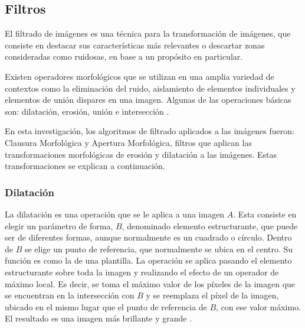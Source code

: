 \subsection{Filtros}\label{sec:filtros}
El filtrado de imágenes es una técnica para la transformación de imágenes, que consiste en destacar  sus características más relevantes o descartar zonas consideradas como ruidosas, en base a un propósito en particular. 

Existen operadores morfológicos que se utilizan en una amplia variedad de contextos como la eliminación del ruido, aislamiento de elementos individuales y elementos de unión dispares en una imagen. Algunas de las operaciones básicas son: dilatación, erosión, uni\'on e intersecci\'on \cite{BookOpenCv}.

En esta investigación, los algoritmos de filtrado aplicados a las imágenes fueron: Clausura Morfológica y Apertura Morfológica, filtros que aplican las transformaciones morfológicas de erosión y dilatación a las imágenes. Estas transformaciones se explican a continuación.

 

\subsubsection{Dilatación}

La dilatación es una operación que se le aplica a una imagen $A$. Esta consiste en elegir un parámetro de forma, $B$, denominado elemento estructurante, que puede ser de diferentes formas, aunque normalmente es un cuadrado o círculo. Dentro de $B$ se elige un punto de referencia, que normalmente se ubica en el centro. Su función es como la de una plantilla. 
La operación se aplica pasando el elemento estructurante sobre toda la imagen y realizando el efecto de un operador de máximo local. Es decir, se toma el m\'aximo valor de los píxeles de la imagen que se encuentran en la intersección con $B$ y se reemplaza el píxel de la imagen, ubicado en el mismo lugar que el punto de referencia de $B$, con ese valor máximo. El resultado es una imagen más brillante  y grande \cite{BookOpenCv}. 

